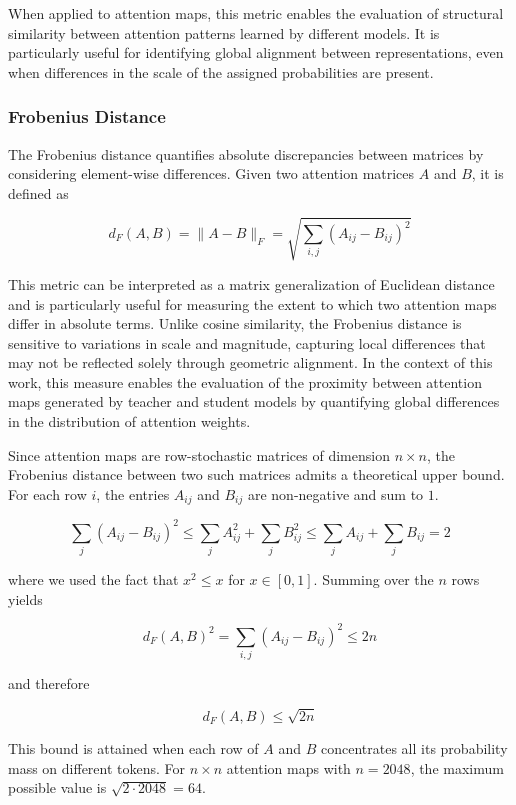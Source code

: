 \documentclass[conference]{IEEEtran}
\begin{document}
When applied to attention maps, this metric enables the evaluation of structural similarity between attention patterns learned by different models. It is particularly useful for identifying global alignment between representations, even when differences in the scale of the assigned probabilities are present.

\subsubsection{Frobenius Distance}

The Frobenius distance quantifies absolute discrepancies between matrices by considering element-wise differences. Given two attention matrices $A$ and $B$, it is defined as

\[
d_F(A,B)
=
\|A-B\|_F
=
\sqrt{
\sum_{i,j}
(A_{ij}-B_{ij})^2
}
\]

This metric can be interpreted as a matrix generalization of Euclidean distance and is particularly useful for measuring the extent to which two attention maps differ in absolute terms. Unlike cosine similarity, the Frobenius distance is sensitive to variations in scale and magnitude, capturing local differences that may not be reflected solely through geometric alignment. In the context of this work, this measure enables the evaluation of the proximity between attention maps generated by teacher and student models by quantifying global differences in the distribution of attention weights.

Since attention maps are row-stochastic matrices of dimension $n \times n$, the Frobenius distance between two such matrices admits a theoretical upper bound. For each row $i$, the entries $A_{ij}$ and $B_{ij}$ are non-negative and sum to $1$.

\[
\sum_j (A_{ij} - B_{ij})^2
\leq
\sum_j A_{ij}^2 + \sum_j B_{ij}^2
\leq
\sum_j A_{ij} + \sum_j B_{ij} = 2
\]

where we used the fact that $x^2 \leq x$ for $x \in [0,1]$. Summing over the $n$ rows yields

\[
d_F(A,B)^2 = \sum_{i,j}(A_{ij}-B_{ij})^2 \leq 2n
\]

and therefore

\[
d_F(A,B) \leq \sqrt{2n}
\]

This bound is attained when each row of $A$ and $B$ concentrates all its probability mass on different tokens. For $n \times n$ attention maps with $n = 2048$, the maximum possible value is $\sqrt{2 \cdot 2048} = 64$.
\end{document}
